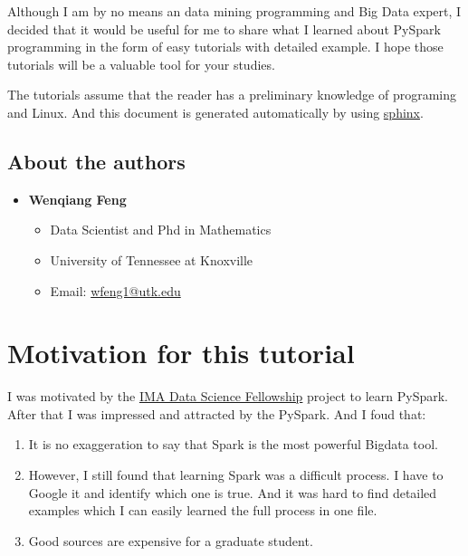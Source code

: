 \documentclass[letterpaper,11pt,english]{sphinxmanual}
\begin{document}
Although I am by no means an data mining programming and Big Data expert,
I decided that it would be useful for me to share what I learned
about PySpark programming in the form of easy tutorials with
detailed example. I hope those tutorials will be a valuable tool
for your studies.

The tutorials assume that the reader has a preliminary knowledge
of programing and Linux. And this document is generated automatically
by using \href{http://sphinx.pocoo.org}{sphinx}.


\subsection{About the authors}
\label{preface:about-the-authors}\begin{itemize}
\item {} 
\textbf{Wenqiang Feng}
\begin{itemize}
\item {} 
Data Scientist and Phd in Mathematics

\item {} 
University of Tennessee at Knoxville

\item {} 
Email: \href{mailto:wfeng1@utk.edu}{wfeng1@utk.edu}

\end{itemize}

\end{itemize}


\section{Motivation for this tutorial}
\label{preface:motivation-for-this-tutorial}
I was motivated by the \href{https://www.ima.umn.edu/2016-2017/SW1.23-3.10.17\#}{IMA Data Science Fellowship}
project to learn PySpark. After that I was impressed and attracted by the
PySpark. And I foud that:
\begin{enumerate}
\item {} 
It is no exaggeration to say that Spark is the most powerful
Bigdata tool.

\item {} 
However, I still found that learning Spark was a difficult
process. I have to Google it and identify which one is true.
And it was hard to find detailed examples which I can easily
learned the full process in one file.

\item {} 
Good sources are expensive for a graduate student.

\end{enumerate}
\end{document}
